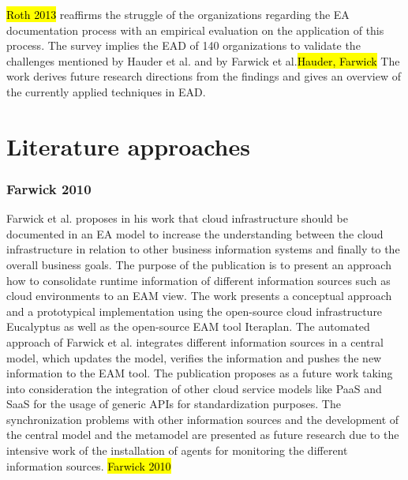 \hl{Roth 2013} reaffirms the struggle of the organizations regarding the EA documentation process with an empirical evaluation on the application of this process. The survey implies the EAD of 140 organizations to validate the challenges mentioned by Hauder et al. and by Farwick et al.\hl{Hauder, Farwick} The work derives future research directions from the findings and gives an overview of the currently applied techniques in EAD. 


\section{Literature approaches}

\subsubsection{Farwick 2010}

Farwick et al. proposes in his work that cloud infrastructure should be documented in an EA model to increase the understanding between the cloud infrastructure in relation to other business information systems and finally to the overall business goals. The purpose of the publication is to present an approach how to consolidate runtime information of different information sources such as cloud environments to an EAM view. The work presents a conceptual approach and a prototypical implementation using the open-source cloud infrastructure Eucalyptus as well as the open-source EAM tool Iteraplan. The automated approach of Farwick et al. integrates different information sources in a central model, which updates the model, verifies the information and pushes the new information to the EAM tool. The publication proposes as a future work taking into consideration the integration of other cloud service models like PaaS and SaaS for the usage of generic APIs for standardization purposes. The synchronization problems with other information sources and the development of the central model and the metamodel are presented as future research due to the intensive work of the installation of agents for monitoring the different information sources. \hl{Farwick 2010}

